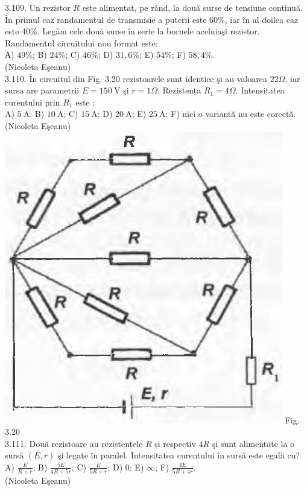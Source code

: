 \documentclass[10pt]{article}
\begin{document}
3.109. Un rezistor $R$ este alimentat, pe rând, la două surse de tensiune continuă. În primul caz randamentul de transmisie a puterii este $60 \%$, iar în al doilea caz este $40 \%$. Legăm cele două surse în serie la bornele aceluiaşi rezistor. Randamentul circuitului nou format este:\\ А) $49 \%$; B) $24 \%$; C) $46 \%$; D) $31,6 \%$; E) $54 \%$; F) $58,4 \%$.\\ (Nicoleta Eşeanu)\\

3.110. În circuitul din Fig. 3.20 rezistoarele sunt identice şi au valoarea $22 \Omega$, iar sursa are parametrii $E=150 \mathrm{~V}$ şi $r=1 \Omega$. Rezistența $R_{1}=4 \Omega$. Intensitatea curentului prin $R_{1}$ este :\\ A) $5 \mathrm{~A}$; B) $10 \mathrm{~A}$; C) $15 \mathrm{~A}$; D) $20 \mathrm{~A}$; E) $25 \mathrm{~A}$; F) nici o variantă nu este corectă.\\ (Nicoleta Eşeanu)\\ \includegraphics[max width=\textwidth, center]{2025_07_01_5b3ff9fa0d508c8e9f17g-167} Fig. 3.20\\

3.111. Două rezistoare au rezistențele $R$ și respectiv $4 R$ şi sunt alimentate la o sursă $(E, r)$ şi legate în paralel. Intensitatea curentului în sursă este egală cu?\\ A) $\frac{E}{R+r}$; B) $\frac{5 E}{4 R+5 r}$; C) $\frac{E}{5 R+r}$; D) 0; E) $\infty$; F) $\frac{4 E}{5 R+4 r}$.\\ (Nicoleta Eşeanu)\\
\end{document}
